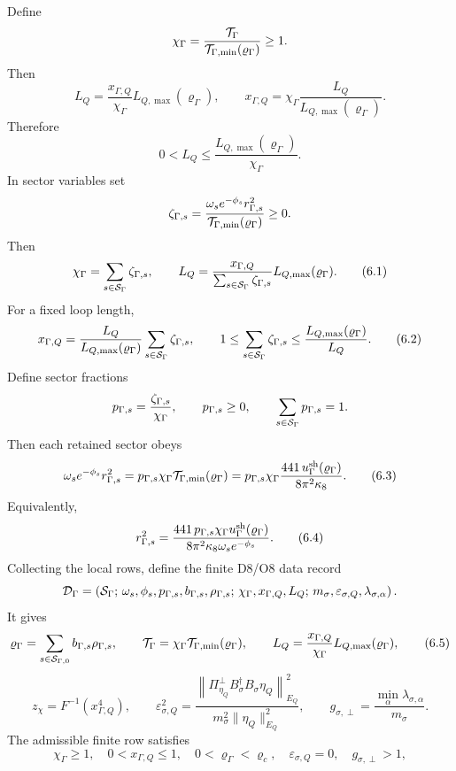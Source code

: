 \documentclass[11pt]{article}
\theoremstyle{definition}
\theoremstyle{remark}
\begin{document}
Define
\[
  \chi_\Gamma
  =
  \frac{{\cal T}_\Gamma}
  {{\cal T}_{\Gamma,\min}(\varrho_\Gamma)}
  \ge1 .
\]
Then
\[
  L_Q
  =
  \frac{x_{\Gamma,Q}}{\chi_\Gamma}
  L_{Q,\max}(\varrho_\Gamma),
  \qquad
  x_{\Gamma,Q}
  =
  \chi_\Gamma
  \frac{L_Q}{L_{Q,\max}(\varrho_\Gamma)} .
\]
Therefore
\[
  0<L_Q\le
  \frac{L_{Q,\max}(\varrho_\Gamma)}{\chi_\Gamma}.
\]
In sector variables set
\[
  \zeta_{\Gamma,s}
  =
  \frac{\omega_s e^{-\phi_s}r_{\Gamma,s}^2}
  {{\cal T}_{\Gamma,\min}(\varrho_\Gamma)}
  \ge0 .
\]
Then
\[
  \chi_\Gamma
  =
  \sum_{s\in{\cal S}_\Gamma}\zeta_{\Gamma,s},
  \qquad
  L_Q
  =
  \frac{x_{\Gamma,Q}}
  {\sum_{s\in{\cal S}_\Gamma}\zeta_{\Gamma,s}}
  L_{Q,\max}(\varrho_\Gamma).
  \tag{6.1}
\]
For a fixed loop length,
\[
  x_{\Gamma,Q}
  =
  \frac{L_Q}{L_{Q,\max}(\varrho_\Gamma)}
  \sum_{s\in{\cal S}_\Gamma}\zeta_{\Gamma,s},
  \qquad
  1\le
  \sum_{s\in{\cal S}_\Gamma}\zeta_{\Gamma,s}
  \le
  \frac{L_{Q,\max}(\varrho_\Gamma)}{L_Q}.
  \tag{6.2}
\]
Define sector fractions
\[
  p_{\Gamma,s}
  =
  \frac{\zeta_{\Gamma,s}}{\chi_\Gamma},
  \qquad
  p_{\Gamma,s}\ge0,
  \qquad
  \sum_{s\in{\cal S}_\Gamma}p_{\Gamma,s}=1 .
\]
Then each retained sector obeys
\[
  \omega_s e^{-\phi_s}r_{\Gamma,s}^2
  =
  p_{\Gamma,s}\chi_\Gamma
  {\cal T}_{\Gamma,\min}(\varrho_\Gamma)
  =
  p_{\Gamma,s}\chi_\Gamma
  \frac{441\,u_\Gamma^{\rm sh}(\varrho_\Gamma)}
  {8\pi^2\kappa_8}.
  \tag{6.3}
\]
Equivalently,
\[
  r_{\Gamma,s}^2
  =
  \frac{441\,p_{\Gamma,s}\chi_\Gamma
  u_\Gamma^{\rm sh}(\varrho_\Gamma)}
  {8\pi^2\kappa_8\omega_s e^{-\phi_s}} .
  \tag{6.4}
\]
Collecting the local rows, define the finite D8/O8 data record
\[
  {\cal D}_\Gamma
  =
  \left(
  {\cal S}_\Gamma;\,
  \omega_s,\phi_s,p_{\Gamma,s},b_{\Gamma,s},\rho_{\Gamma,s};\,
  \chi_\Gamma,x_{\Gamma,Q},L_Q;\,
  m_\sigma,\varepsilon_{\sigma,Q},\lambda_{\sigma,\alpha}
  \right).
\]
It gives
\[
  \varrho_\Gamma
  =
  \sum_{s\in{\cal S}_{\Gamma,0}}b_{\Gamma,s}\rho_{\Gamma,s},
  \qquad
  {\cal T}_\Gamma
  =
  \chi_\Gamma{\cal T}_{\Gamma,\min}(\varrho_\Gamma),
  \qquad
  L_Q
  =
  \frac{x_{\Gamma,Q}}{\chi_\Gamma}
  L_{Q,\max}(\varrho_\Gamma),
  \tag{6.5}
\]
\[
  z_\chi=F^{-1}(x_{\Gamma,Q}^4),
  \qquad
  \varepsilon_{\sigma,Q}^2
  =
  \frac{
  \left\|
  \Pi_{\eta_Q}^\perp B_\sigma^\dagger B_\sigma\eta_Q
  \right\|_{E_Q}^2}
  {m_\sigma^2\|\eta_Q\|_{E_Q}^2},
  \qquad
  g_{\sigma,\perp}
  =
  \frac{\min_\alpha\lambda_{\sigma,\alpha}}{m_\sigma}.
  \tag{6.6}
\]
The admissible finite row satisfies
\[
  \chi_\Gamma\ge1,\quad
  0<x_{\Gamma,Q}\le1,\quad
  0<\varrho_\Gamma<\varrho_c,\quad
  \varepsilon_{\sigma,Q}=0,\quad
  g_{\sigma,\perp}>1,
  \tag{6.7}
\]
\end{document}
